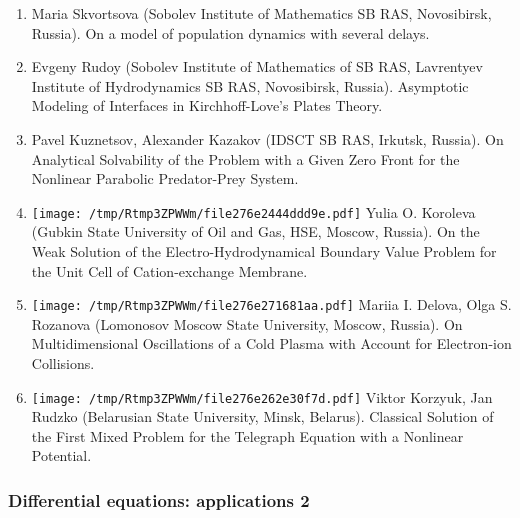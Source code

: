 \documentclass[
]{article}
\providecommand{\tightlist}{%
  \setlength{\itemsep}{0pt}\setlength{\parskip}{0pt}}
\begin{document}
\begin{enumerate}
\def\labelenumi{\arabic{enumi}.}
\tightlist
\item
  Maria Skvortsova (Sobolev Institute of Mathematics SB RAS,
  Novosibirsk, Russia). On a model of population dynamics with several
  delays.
\item
  Evgeny Rudoy (Sobolev Institute of Mathematics of SB RAS, Lavrentyev
  Institute of Hydrodynamics SB RAS, Novosibirsk, Russia). Asymptotic
  Modeling of Interfaces in Kirchhoff-Love's Plates Theory.
\item
  Pavel Kuznetsov, Alexander Kazakov (IDSCT SB RAS, Irkutsk, Russia). On
  Analytical Solvability of the Problem with a Given Zero Front for the
  Nonlinear Parabolic Predator-Prey System.
\item
  \protect\texttt{[image: /tmp/Rtmp3ZPWWm/file276e2444ddd9e.pdf]}
  Yulia O. Koroleva (Gubkin State University of Oil and Gas, HSE,
  Moscow, Russia). On the Weak Solution of the Electro-Hydrodynamical
  Boundary Value Problem for the Unit Cell of Cation-exchange Membrane.
\item
  \protect\texttt{[image: /tmp/Rtmp3ZPWWm/file276e271681aa.pdf]}
  Mariia I. Delova, Olga S. Rozanova (Lomonosov Moscow State University,
  Moscow, Russia). On Multidimensional Oscillations of a Cold Plasma
  with Account for Electron-ion Collisions.
\item
  \protect\texttt{[image: /tmp/Rtmp3ZPWWm/file276e262e30f7d.pdf]}
  Viktor Korzyuk, Jan Rudzko (Belarusian State University, Minsk,
  Belarus). Classical Solution of the First Mixed Problem for the
  Telegraph Equation with a Nonlinear Potential.
\end{enumerate}

\hypertarget{dea2}{%
\subsubsection{Differential equations: applications 2}\label{dea2}}
\end{document}

